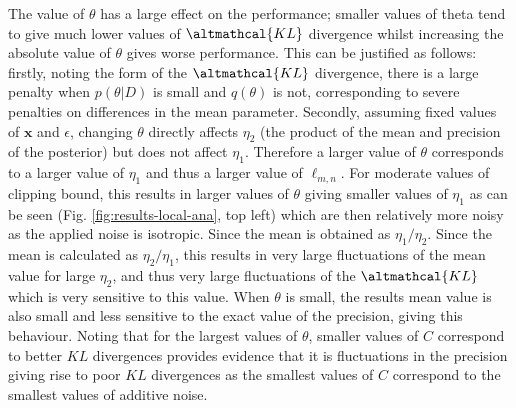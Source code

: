 The value of $\theta$ has a large effect on the performance; smaller values of theta tend to give much lower values of $\altmathcal{KL}$ divergence whilst increasing the absolute value of $\theta$ gives worse performance. This can be justified as follows: firstly, noting the form of the $\altmathcal{KL}$ divergence, there is a large penalty when $p(\theta|D)$ is small and $q(\theta)$ is not, corresponding to severe penalties on differences in the mean parameter. Secondly, assuming fixed values of $\bm{x}$ and $\epsilon$, changing $\theta$ directly affects $\eta_2$ (the product of the mean and precision of the posterior) but does not affect $\eta_1$. Therefore a larger value of $\theta$ corresponds to a larger value of $\eta_1$ and thus a larger value of $\ell_{m,n}$. For moderate values of clipping bound, this results in larger values of $\theta$ giving smaller values of $\eta_1$ as can be seen (Fig. \ref{fig:results-local-ana}, top left) which are then relatively more noisy as the applied noise is isotropic. Since the mean is obtained as $\eta_1 / \eta_2$. Since the mean is calculated as $\eta_2 / \eta_1$, this results in very large fluctuations of the mean value for large $\eta_2$, and thus very large fluctuations of the $\altmathcal{KL}$ which is very sensitive to this value. When $\theta$ is small, the results mean value is also small and less sensitive to the exact value of the precision, giving this behaviour. Noting that for the largest values of $\theta$, smaller values of $C$ correspond to better $KL$ divergences provides evidence that it is fluctuations in the precision giving rise to poor $KL$ divergences as the smallest values of $C$ correspond to the smallest values of additive noise.

